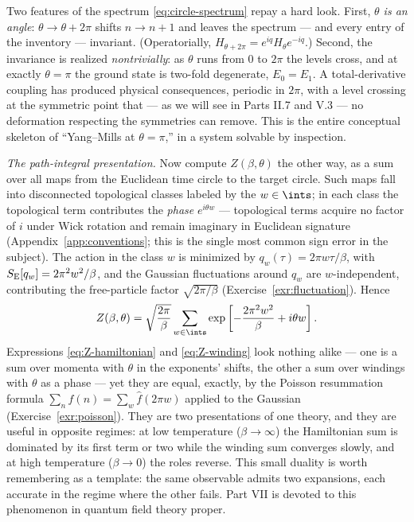 \begin{eexample}[The inventory in $d=1$: a particle on a circle]
Two features of the spectrum \eqref{eq:circle-spectrum} repay a hard look.
First, \emph{$\theta$ is an angle}: $\theta \to \theta + 2\pi$ shifts $n \to
n+1$ and leaves the spectrum --- and every entry of the inventory --- invariant.
(Operatorially, $H_{\theta+2\pi} = e^{iq} H_\theta e^{-iq}$.) Second, the
invariance is realized \emph{nontrivially}: as $\theta$ runs from $0$ to $2\pi$
the levels cross, and at exactly $\theta = \pi$ the ground state is two-fold
degenerate, $E_0 = E_1$. A total-derivative coupling has produced physical
consequences, periodic in $2\pi$, with a level crossing at the symmetric point
that --- as we will see in Parts II.7 and V.3 --- no deformation respecting the
symmetries can remove. This is the entire conceptual skeleton of ``Yang--Mills
at $\theta = \pi$,'' in a system solvable by inspection.

\emph{The path-integral presentation.} Now compute $Z(\beta,\theta)$ the other
way, as a sum over all maps from the Euclidean time circle to the target circle.
Such maps fall into disconnected topological classes labeled by the
 $w \in \ints$; in each class the topological term
contributes the \emph{phase} $e^{i\theta w}$ --- topological terms acquire no
factor of $i$ under Wick rotation and remain imaginary in Euclidean signature
(Appendix~\ref{app:conventions}; this is the single most common sign error in
the subject). The action in the class $w$ is minimized by $q_w(\tau) = 2\pi w
\tau/\beta$, with $S_{\rm E}[q_w] = 2\pi^2 w^2/\beta$, and the Gaussian
fluctuations around $q_w$ are $w$-independent, contributing the free-particle
factor $\sqrt{2\pi/\beta}$ (Exercise~\ref{exr:fluctuation}). Hence
\begin{equation}
Z(\beta,\theta) = \sqrt{\frac{2\pi}{\beta}} \sum_{w \in \ints}
  \exp\left[-\frac{2\pi^2 w^2}{\beta} + i \theta w\right].
\label{eq:Z-winding}
\end{equation}
Expressions \eqref{eq:Z-hamiltonian} and \eqref{eq:Z-winding} look nothing alike
--- one is a sum over momenta with $\theta$ in the exponents' shifts, the other
a sum over windings with $\theta$ as a phase --- yet they are equal, exactly, by
the Poisson resummation formula $\sum_n f(n) = \sum_w \hat f(2\pi w)$ applied to
the Gaussian (Exercise~\ref{exr:poisson}). They are two presentations of one
theory, and they are useful in opposite regimes: at low temperature ($\beta \to
\infty$) the Hamiltonian sum is dominated by its first term or two while the
winding sum converges slowly, and at high temperature ($\beta \to 0$) the roles
reverse. This small duality is worth remembering as a template: the same
observable admits two expansions, each accurate in the regime where the
other fails. Part VII is devoted to this phenomenon in quantum field theory
proper.
\end{eexample}

